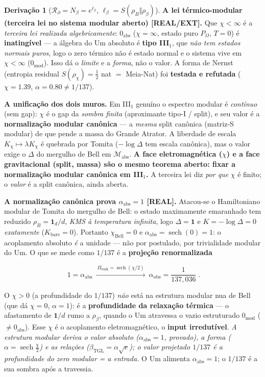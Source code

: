 \documentclass[11pt]{article}
\newcommand{\bTGL}{\beta_{\mathrm{TGL}}}\newcommand{\Msun}{M_{\odot}}\newcommand{\TGL}{\mathrm{TGL}}
\theoremstyle{definition}\newtheorem{deriv}{Derivação}
\begin{document}
\begin{deriv}[$\mathcal{R}_\partial=N_\beta=e^{\ell_\beta}$, $\ell_\beta=S(\rho_B\Vert\rho_\beta)$]
\textbf{A lei térmico-modular (terceira lei no sistema modular aberto) \textsf{[REAL/EXT]}.} Que $\chi<\infty$ é a \emph{terceira lei realizada algebricamente}: $0_{\mathrm{abs}}$ ($\chi=\infty$, estado puro $P_\Omega$, $T=0$) é \textbf{inatingível} --- a álgebra do Um absoluto é \textbf{tipo III$_1$}, que \emph{não tem estados normais puros}, logo o zero térmico não é estado normal e o sistema vive em $\chi<\infty$ ($0_{\mathrm{mod}}$). Isso dá o \emph{limite} e a \emph{forma}, não o valor. A forma de Nernst (entropia residual $S(\rho_\chi)=\tfrac12$ nat $=$ Meia-Nat) foi \textbf{testada e refutada} ($\chi=1.39$, $\alpha=0.80\neq1/137$).

\textbf{A unificação dos dois muros.} Em III$_1$ genuíno o espectro modular é \emph{contínuo} (sem gap): $\chi$ é o gap da \emph{sombra finita} (aproximante tipo-I / split), e seu valor é a \textbf{normalização modular canônica} --- a \emph{mesma} split canônica (matriz-S modular) de que pende a massa do Grande Atrator. A liberdade de escala $K_\chi\mapsto\lambda K_\chi$ é quebrada por Tomita ($-\log\Delta$ tem escala canônica), mas o valor exige o $\Delta$ do mergulho de Bell em $\mathcal{M}_{\mathrm{abs}}$. \textbf{A face eletromagnética ($\chi$) e a face gravitacional (split, massa) são o mesmo teorema aberto: fixar a normalização modular canônica em III$_1$.} A terceira lei diz \emph{por que} $\chi$ é finito; o \emph{valor} é a split canônica, ainda aberta.

\textbf{A normalização canônica prova $\alpha_{\mathrm{abs}}=1$ \textsf{[REAL]}.} Atacou-se o Hamiltoniano modular de Tomita do mergulho de Bell: o estado maximamente emaranhado tem reduzido $\rho_B=\mathbf 1_d/d$, \emph{KMS à temperatura infinita}, logo $\Delta=\mathbf 1$ e $K=-\log\Delta=0$ \emph{exatamente} ($K_{\mathrm{bare}}=0$). Portanto $\chi_{\mathrm{Bell}}=0$ e $\boxed{\alpha_{\mathrm{abs}}=\operatorname{sech}(0)=1}$: o acoplamento absoluto \emph{é} a unidade --- não por postulado, por trivialidade modular do Um. O que se mede como $1/137$ é a \textbf{projeção renormalizada}

\begin{equation}\boxed{\;1=\alpha_{\mathrm{abs}}\ \xrightarrow{\ \Pi_{\mathrm{bulk}}=\operatorname{sech}(\chi/2)\ }\ \alpha_{\mathrm{obs}}=\frac{1}{137{,}036}\;}.\end{equation}

O $\chi>0$ (a profundidade do $1/137$) \emph{não} está na estrutura modular nua de Bell (que dá $\chi=0$, $\alpha=1$): é a \textbf{profundidade da relaxação térmica} --- o afastamento de $\mathbf 1/d$ rumo a $\rho_\beta$, quando o Um atravessa o vazio estruturado $0_{\mathrm{mod}}$ ($\neq 0_{\mathrm{abs}}$). Esse $\chi$ é o acoplamento eletromagnético, o \textbf{input irredutível}. \emph{A estrutura modular deriva o valor absoluto ($\alpha_{\mathrm{abs}}=1$, provado), a forma ($\alpha=\operatorname{sech}\tfrac\chi2$) e as relações ($\bTGL=\alpha\sqrt e$); o valor projetado $1/137$ é a profundidade do zero modular = a entrada.} O Um alimenta $\alpha_{\mathrm{abs}}=1$; o $1/137$ é a sua sombra após a travessia.


\end{deriv}
\end{document}

